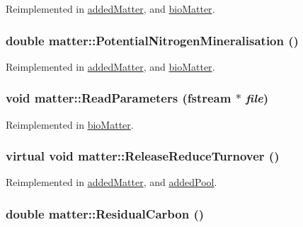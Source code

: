 Reimplemented in \hyperlink{classadded_matter_a68f5728f82221029360bb31ba2fc1673}{addedMatter}, and \hyperlink{classbio_matter_a313cea693a2fb094b2e9bf591439ad3a}{bioMatter}.\hypertarget{classmatter_a59fa9a6e0ff21bac9ab9fb5b4de9392f}{
\subsubsection[{PotentialNitrogenMineralisation}]{\setlength{\rightskip}{0pt plus 5cm}double matter::PotentialNitrogenMineralisation ()}}
\label{classmatter_a59fa9a6e0ff21bac9ab9fb5b4de9392f}


Reimplemented in \hyperlink{classadded_matter_a972a4d0ee6fbd8ca8c48be2162c85646}{addedMatter}, and \hyperlink{classbio_matter_a10072a4f5ed6d3462c9872e4836f4adc}{bioMatter}.\hypertarget{classmatter_a8418c63bc2206df9cb0de19aa195eeac}{
\subsubsection[{ReadParameters}]{\setlength{\rightskip}{0pt plus 5cm}void matter::ReadParameters (fstream $\ast$ {\em file})}}
\label{classmatter_a8418c63bc2206df9cb0de19aa195eeac}


Reimplemented in \hyperlink{classbio_matter_aa792422d773ba544fe0e70ea8d5b061e}{bioMatter}.\hypertarget{classmatter_a9fe8f4ee934f280c9964dacc27d42611}{
\subsubsection[{ReleaseReduceTurnover}]{\setlength{\rightskip}{0pt plus 5cm}virtual void matter::ReleaseReduceTurnover ()}}
\label{classmatter_a9fe8f4ee934f280c9964dacc27d42611}


Reimplemented in \hyperlink{classadded_matter_a899b9d029676aa6711339be2479b29d3}{addedMatter}, and \hyperlink{classadded_pool_a53baccaba22ddacc656b75d90d32fa15}{addedPool}.\hypertarget{classmatter_abaf880e3b1efd04eae0db055caed9b12}{
\subsubsection[{ResidualCarbon}]{\setlength{\rightskip}{0pt plus 5cm}double matter::ResidualCarbon ()}}
\label{classmatter_abaf880e3b1efd04eae0db055caed9b12}


